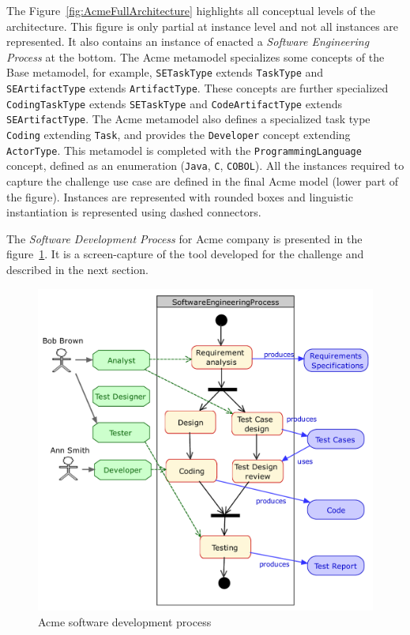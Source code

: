The Figure~\ref{fig:AcmeFullArchitecture} highlights all conceptual levels of the architecture. This figure is only partial at instance level and not all instances are represented. It also contains an instance of enacted a \textit{Software Engineering Process} at the bottom. The Acme metamodel specializes some concepts of the Base metamodel, for example, \texttt{SETaskType} extends \texttt{TaskType} and \texttt{SEArtifactType} extends \texttt{ArtifactType}. These concepts are further specialized  \texttt{CodingTaskType} extends \texttt{SETaskType} and \texttt{CodeArtifactType} extends \texttt{SEArtifactType}. 
The Acme metamodel also defines a specialized task type \texttt{Coding} extending \texttt{Task}, and provides the \texttt{Developer} concept extending \texttt{ActorType}. This metamodel is completed with the \texttt{ProgrammingLanguage} concept, defined as an enumeration (\texttt{Java}, \texttt{C}, \texttt{COBOL}). All the instances required to capture the challenge use case are defined in the final Acme model (lower part of the figure). Instances are represented with rounded boxes and linguistic instantiation is represented using dashed connectors.

The \textit{Software Development Process} for Acme company is presented in the figure~\ref{fig:AcmeSoftwareDevelopmentProcess}. It is a screen-capture of the tool developed for the challenge and described in the next section. 

\begin{figure}[t]
 \centering
    \includegraphics[width=1.0 \columnwidth]{Figures/SoftwareEngineeringProcessCroped.pdf}
     \caption{Acme software development process}
    \label{fig:AcmeSoftwareDevelopmentProcess}
\end{figure}

